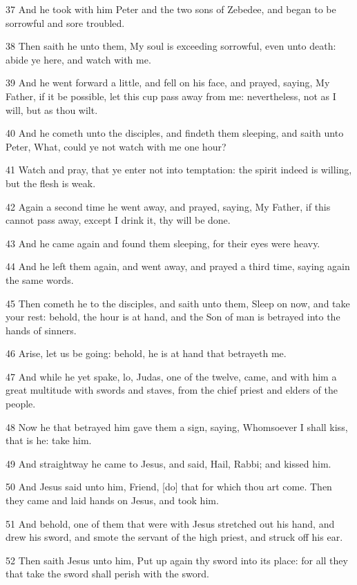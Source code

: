\par 37 And he took with him Peter and the two sons of Zebedee, and began to be sorrowful and sore troubled.
\par 38 Then saith he unto them, My soul is exceeding sorrowful, even unto death: abide ye here, and watch with me.
\par 39 And he went forward a little, and fell on his face, and prayed, saying, My Father, if it be possible, let this cup pass away from me: nevertheless, not as I will, but as thou wilt.
\par 40 And he cometh unto the disciples, and findeth them sleeping, and saith unto Peter, What, could ye not watch with me one hour?
\par 41 Watch and pray, that ye enter not into temptation: the spirit indeed is willing, but the flesh is weak.
\par 42 Again a second time he went away, and prayed, saying, My Father, if this cannot pass away, except I drink it, thy will be done.
\par 43 And he came again and found them sleeping, for their eyes were heavy.
\par 44 And he left them again, and went away, and prayed a third time, saying again the same words.
\par 45 Then cometh he to the disciples, and saith unto them, Sleep on now, and take your rest: behold, the hour is at hand, and the Son of man is betrayed into the hands of sinners.
\par 46 Arise, let us be going: behold, he is at hand that betrayeth me.
\par 47 And while he yet spake, lo, Judas, one of the twelve, came, and with him a great multitude with swords and staves, from the chief priest and elders of the people.
\par 48 Now he that betrayed him gave them a sign, saying, Whomsoever I shall kiss, that is he: take him.
\par 49 And straightway he came to Jesus, and said, Hail, Rabbi; and kissed him.
\par 50 And Jesus said unto him, Friend, [do] that for which thou art come. Then they came and laid hands on Jesus, and took him.
\par 51 And behold, one of them that were with Jesus stretched out his hand, and drew his sword, and smote the servant of the high priest, and struck off his ear.
\par 52 Then saith Jesus unto him, Put up again thy sword into its place: for all they that take the sword shall perish with the sword.
